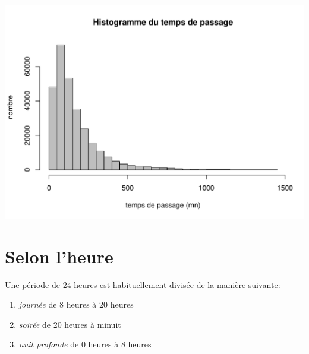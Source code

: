 \documentclass[12pt,english,french,twoside]{book}\usepackage[]{graphicx}\usepackage[]{color}
\makeatletter
\def\maxwidth{ %
  \ifdim\Gin@nat@width>\linewidth
    \linewidth
  \else
    \Gin@nat@width
  \fi
}
\newenvironment{knitrout}{}{} %
\makeatother
\begin{document}
 \begin{center}
\begin{knitrout}
\color{fgcolor}
\includegraphics[width=\maxwidth]{figure/hist_tous_passages-1} 

\end{knitrout}
 \label{fig:hist_passages}
\end{center}


\section{Selon l'heure}

Une période de 24 heures est habituellement divisée de la manière suivante:
\begin{enumerate}
  \item \emph{journée} de 8 heures à 20 heures
  \item \emph{soirée} de 20 heures à minuit
  \item  \emph{nuit profonde} de 0 heures à 8 heures
\end{enumerate}
\end{document}
